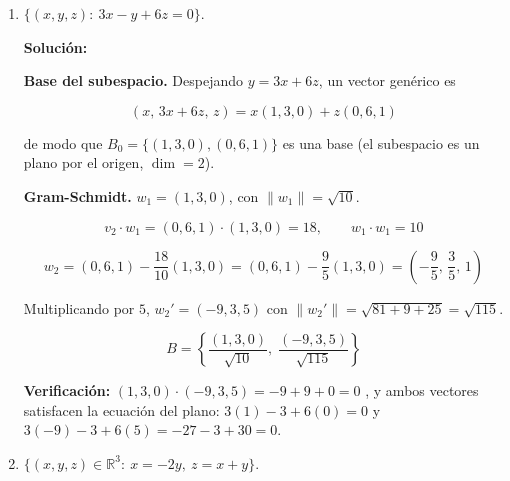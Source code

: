 \documentclass[12pt]{article}
\newcommand{\solucion}{%
    \vspace{0.8em}%
    \textbf{Solución:}%
    \vspace{0.8em}%
}
\begin{document}
\begin{enumerate}[label=\alph*.-]
    \textbf{Primer vector.} $w_1=(1,5)$, con $\|w_1\|=\sqrt{1+25}=\sqrt{26}$.

    \[
    e_1=\frac{1}{\sqrt{26}}(1,5)
    \]

    \textbf{Segundo vector.} Con $v_2=(-1,1)$:

    \[
    v_2\cdot w_1=-1+5=4,\qquad w_1\cdot w_1=26
    \]

    \[
    w_2=(-1,1)-\frac{4}{26}(1,5)=(-1,1)-\frac{2}{13}(1,5)
    =\left(-\frac{15}{13},\,\frac{3}{13}\right)
    \]

    Multiplicando por $\tfrac{13}{3}$, $w_2'=(-5,1)$ con
    $\|w_2'\|=\sqrt{25+1}=\sqrt{26}$:

    \[
    e_2=\frac{1}{\sqrt{26}}(-5,1)
    \]

    \[
    \boxed{
    B=\left\{
    \frac{(1,5)}{\sqrt{26}},\;
    \frac{(-5,1)}{\sqrt{26}}
    \right\}
    }
    \]

    \textbf{Verificación:} $(1,5)\cdot(-5,1)=-5+5=0$. \checkmark

    \item $\{(x,y,z):\ 3x-y+6z=0\}$.

    \solucion

    \textbf{Base del subespacio.} Despejando $y=3x+6z$, un vector genérico es

    \[
    (x,\,3x+6z,\,z)=x(1,3,0)+z(0,6,1)
    \]

    de modo que $B_0=\{(1,3,0),(0,6,1)\}$ es una base (el subespacio es un
    plano por el origen, $\dim=2$).

    \textbf{Gram-Schmidt.} $w_1=(1,3,0)$, con $\|w_1\|=\sqrt{10}$.

    \[
    v_2\cdot w_1=(0,6,1)\cdot(1,3,0)=18,\qquad w_1\cdot w_1=10
    \]

    \[
    w_2=(0,6,1)-\frac{18}{10}(1,3,0)=(0,6,1)-\frac{9}{5}(1,3,0)
    =\left(-\frac{9}{5},\,\frac{3}{5},\,1\right)
    \]

    Multiplicando por $5$, $w_2'=(-9,3,5)$ con
    $\|w_2'\|=\sqrt{81+9+25}=\sqrt{115}$.

    \[
    \boxed{
    B=\left\{
    \frac{(1,3,0)}{\sqrt{10}},\;
    \frac{(-9,3,5)}{\sqrt{115}}
    \right\}
    }
    \]

    \textbf{Verificación:} $(1,3,0)\cdot(-9,3,5)=-9+9+0=0$ \checkmark, y ambos
    vectores satisfacen la ecuación del plano:
    $3(1)-3+6(0)=0$ y $3(-9)-3+6(5)=-27-3+30=0$. \checkmark

    \item $\{(x,y,z)\in\mathbb{R}^3:\ x=-2y,\ z=x+y\}$.


\end{enumerate}
\end{document}
